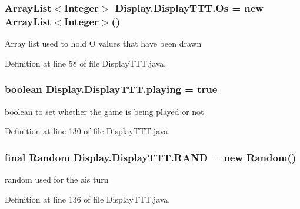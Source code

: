 \subsubsection[{Os}]{\setlength{\rightskip}{0pt plus 5cm}Array\+List$<$Integer$>$ Display.\+Display\+T\+T\+T.\+Os = new Array\+List$<$Integer$>$()\hspace{0.3cm}{\ttfamily [private]}}\label{class_display_1_1_display_t_t_t_a06c277ab266ff9c323c13e1fd50299d2}
Array list used to hold O values that have been drawn 

Definition at line 58 of file Display\+T\+T\+T.\+java.

\hypertarget{class_display_1_1_display_t_t_t_abea0091c8be45438d7be31081d6b8bc3}{}
\subsubsection[{playing}]{\setlength{\rightskip}{0pt plus 5cm}boolean Display.\+Display\+T\+T\+T.\+playing = true\hspace{0.3cm}{\ttfamily [private]}}\label{class_display_1_1_display_t_t_t_abea0091c8be45438d7be31081d6b8bc3}
boolean to set whether the game is being played or not 

Definition at line 130 of file Display\+T\+T\+T.\+java.

\hypertarget{class_display_1_1_display_t_t_t_a532c82249100ab477c093e5202b42415}{}
\subsubsection[{R\+A\+N\+D}]{\setlength{\rightskip}{0pt plus 5cm}final Random Display.\+Display\+T\+T\+T.\+R\+A\+N\+D = new Random()\hspace{0.3cm}{\ttfamily [private]}}\label{class_display_1_1_display_t_t_t_a532c82249100ab477c093e5202b42415}
random used for the ai\textquotesingle{}s turn 

Definition at line 136 of file Display\+T\+T\+T.\+java.

\hypertarget{class_display_1_1_display_t_t_t_a30415017d1d80126ca6295a1d711684d}{}
